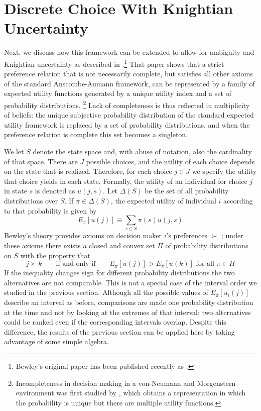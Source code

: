 \documentclass{article}
\renewcommand{\cite}{\citet}
\begin{document}
\section{Discrete Choice With Knightian Uncertainty}

Next, we discuss how this framework can be extended to allow for ambiguity
and Knightian uncertainty as described in \cite{Bewley86}.\footnote{%
Bewley's original paper has been published recently as \cite{Bewley02}.}
That paper shows that a strict preference relation that is not necessarily
complete, but satisfies all other axioms of the standard Anscombe-Aumann
framework, can be represented by a family of expected utility functions
generated by a unique utility index and a set of probability distributions.%
\footnote{%
Incompleteness in decision making in a von-Neumann and Morgenstern
environment was first studied by \cite{Aumann62}, which obtains a
representation in which the probability is unique but there are multiple
utility functions.} Lack of completeness is thus reflected in multiplicity
of beliefs: the unique subjective probability distribution of the standard
expected utility framework is replaced by a set of probability
distributions, and when the preference relation is complete this set becomes
a singleton.

We let $S$ denote the state space and, with abuse of notation, also the
cardinality of that space. There are $J$ possible choices, and the utility
of each choice depends on the state that is realized. Therefore, for each
choice $j\in J$ we specify the utility that choice yields in each state.
Formally, the utility of an individual for choice $j$ in state $s$ is
denoted as $u\left( j,s\right) $. Let $\Delta (S)$ be the set of all
probability distributions over $S$. If $\pi \in \Delta (S)$, the expected
utility of individual $i$ according to that probability is given by 
\begin{equation*}
E_{\pi }\left[ u\left( j\right) \right] \equiv \sum_{s\in S}\pi \left(
s\right) u\left( j,s\right)
\end{equation*}%
Bewley's theory provides axioms on decision maker $i$'s preferences $\succ $%
; under these axioms there exists a closed and convex set $\Pi $ of
probability distributions on $S$ with the property that 
\begin{equation*}
j\succ k\qquad \text{if and only if}\qquad E_{\pi }\left[ u\left( j\right) %
\right] >E_{\pi }\left[ u\left( k\right) \right] \text{ for all }\pi \in \Pi
\end{equation*}%
If the inequality changes sign for different probability distributions the
two alternatives are not comparable. This is not a special case of the
interval order we studied in the previous section. Although all the possible
values of $E_{\pi }\left[ u_{i}\left( j\right) \right] $ describe an
interval as before, comparisons are made one probability distribution at the
time and not by looking at the extremes of that interval; two alternatives
could be ranked even if the corresponding intervals overlap. Despite this
difference, the results of the previous section can be applied here by
taking advantage of some simple algebra.
\end{document}
